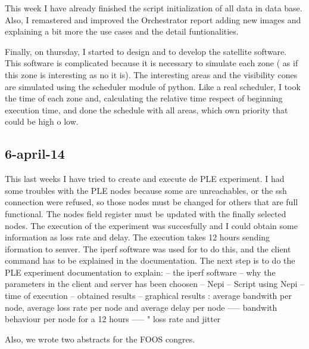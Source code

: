 This week I have already finished the script initialization of all data in data base.
Also, I remastered and improved the Orchestrator report adding new images and explaining a bit more the use cases and the detail funtionalities.

Finally, on thursday, I started to design and to develop the satellite software. This software is complicated because it is necessary to simulate each zone ( as if this zone is interesting as no it is). The interesting areas and the visibility cones are simulated using the scheduler module of python.
Like a real scheduler, I took the time of each zone and, calculating the relative time respect of beginning execution time, and done the schedule with all areas, which own priority that could be high o low.

\subsection{6-april-14}
This last weeks I have tried to create and execute de PLE experiment. I had some troubles with the PLE nodes because some are unreachables, or the ssh connection were refused, so those nodes 
must be changed for others that are full functional.
The nodes field register must be updated with the finally selected nodes.
The execution of the experiment was succesfully and I could obtain some information as loss rate and delay. The execution takes 12 hours sending iformation to senver.
The iperf software was used for to do this, and the client command has to be explained in the documentation.
The next step is to do the PLE experiment documentation to explain:
-- the iperf software
-- why the parameters in the client and server has been choosen
-- Nepi
-- Script using Nepi
-- time of execution
-- obtained results
-- graphical results : average bandwith per node, average loss rate per node and average delay per node
----- bandwith behaviour per node for a 12 hours
----- " loss rate and jitter

Also, we wrote two abstracts for the FOOS congres.

